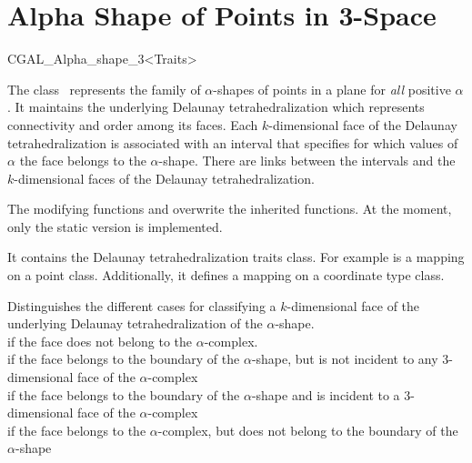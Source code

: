 \newpage

\section{Alpha Shape of Points in 3-Space \label{I1_SectAlpha Shape_3}}

\begin{ccClassTemplate} {CGAL_Alpha_shape_3<Traits>}

\ccDefinition
The class \ccClassTemplateName\ represents the family of
$\alpha$-shapes of points in a plane for {\em all} positive
$\alpha$. It maintains the underlying Delaunay tetrahedralization which
represents connectivity and order among its faces. Each
$k$-dimensional face of the Delaunay tetrahedralization is associated with
an interval that specifies for which values of $\alpha$ the face
belongs to the $\alpha$-shape. There are links between the intervals
and the $k$-dimensional faces of the Delaunay tetrahedralization.



\ccInheritsFrom


The modifying functions  and  overwrite
the inherited functions. At the moment, only the static version is implemented.

\ccTypes
{}
\ccThreeToTwo

 
It contains the Delaunay tetrahedralization traits class.  For example
 is a mapping on a point class. Additionally,
it defines a mapping on a coordinate type class.



{Distinguishes the different cases for classifying a $k$-dimensional face
 of the underlying Delaunay tetrahedralization of the $\alpha$-shape. \\
 if the face does not belong to the $\alpha$-complex.\\
 if the face belongs to the boundary of the $\alpha$-shape,
 but is not incident to any 3-dimensional face of the $\alpha$-complex\\
 if the face belongs to the boundary of the $\alpha$-shape
 and is incident to a 3-dimensional face of the $\alpha$-complex\\
 if the face belongs to the $\alpha$-complex, but does
not belong to the boundary of the $\alpha$-shape\\}


\end{ccClassTemplate}

